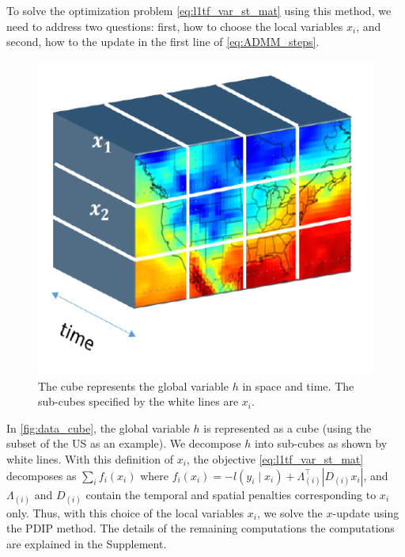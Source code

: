 \documentclass{article}
\DeclareMathOperator*{\argmin}{argmin}
\newcommand{\given}{\;\vert\;}
\begin{document}
To solve the optimization problem \eqref{eq:l1tf_var_st_mat} using
this method, we need to address two 
questions: first, how to choose the 
local variables $x_i$, and second, how to the update in the first line of
\eqref{eq:ADMM_steps}.

\begin{figure}[tb]
  \centering
  \includegraphics[height=.2\textheight]{Figures/data_cube}
  \caption{The cube represents the global variable $h$ in space and
    time. The sub-cubes specified by the white lines are
    $x_i$.}
  \label{fig:data_cube}
\end{figure} 


In \autoref{fig:data_cube}, the global variable $h$ is represented
as a cube (using the subset of the US as an example). We decompose $h$
into sub-cubes as shown by white lines. With
this definition of $x_i$, the objective
\eqref{eq:l1tf_var_st_mat} decomposes as $\sum_i f_i(x_i)$ where
$f_i(x_i)=-l(y_i\given x_i)+\Lambda_{(i)}^\top |D_{(i)}x_i|$, and
$\Lambda_{(i)}$ and $D_{(i)}$ contain the temporal and spatial
penalties corresponding to $x_i$ only. 
Thus, with this choice of the local variables $x_i$, we solve the
$x$-update using the PDIP method. 
The details of the remaining computations
the computations are explained in the Supplement.
\end{document}
